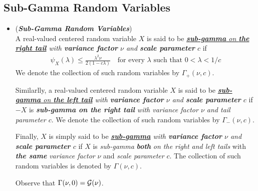 \documentclass[11pt]{article}
\begin{document}
\subsection{Sub-Gamma Random Variables}
\begin{itemize}
\item \begin{definition}(\emph{\textbf{Sub-Gamma Random Variables}})\\
A real-valued centered random variable $X$ is said to be \emph{\underline{\textbf{sub-gamma} on \textbf{the right tail}} with \textbf{variance factor} $\nu$ and \textbf{scale parameter} $c$} if
\begin{align*}
\psi_X(\lambda) \le \frac{\lambda^2 \nu}{2(1 - c\lambda)} \quad \text{for every $\lambda$ such that $0 < \lambda < 1/c$} 
\end{align*} We denote the collection of such random variables by $\Gamma_{+}(\nu, c)$.

Similarlly, a real-valued centered random variable $X$ is said to be \emph{\underline{\textbf{sub-gamma} on \textbf{the left tail}} with \textbf{variance factor} $\nu$ and \textbf{scale parameter} $c$} if $-X$ is \emph{\textbf{sub-gamma on the right tail} with variance factor $\nu$ and tail parameter $c$}. We denote the collection of such random variables by $\Gamma_{-}(\nu, c)$. 

Finally, $X$ is simply said to be \emph{\underline{\textbf{sub-gamma}} with \textbf{variance factor} $\nu$ and \textbf{scale parameter} $c$} if $X$ is \emph{sub-gamma} \emph{\textbf{both}} \emph{on the right and left tails} with \emph{\textbf{the same}} \emph{variance factor} $\nu$ and \emph{scale parameter} $c$. The collection of such random variables is denoted by  $\Gamma(\nu, c)$.

Observe that $\Gamma(\nu, 0)= {\mathcal G}(\nu)$.
\end{definition}


\end{itemize}
\end{document}
